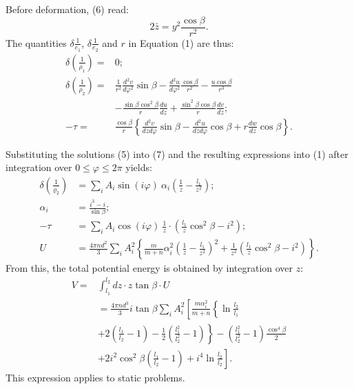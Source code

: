 \documentclass[11pt]{amsart}
\begin{document}
Before deformation, (6) read:
\[2\bar{z}=y^2 \frac{\cos \beta}{r^2}.\]
The quantities
\(\delta \frac{1}{e_1}\), \(\delta \frac{1}{e_2} \)
and \(r\) in Equation (1) are thus:
\begin{equation}\label{eq7p733}
\begin{aligned}
\delta\left(\frac{1}{\rho_1}\right)= & 0; \\
\delta\left(\frac{1}{\rho_2}\right)= & \frac{1}{r^2} \frac{d^2 v}{d \varphi^2} \sin \beta-\frac{d^2 u}{d \varphi^2} \frac{\cos \beta}{r^2}-\frac{u \cos \beta}{r^3} \\
& -\frac{\sin \beta \cos ^2 \beta}{r} \frac{d u}{d z}+\frac{\sin ^2 \beta \cos \beta}{r} \frac{d v}{d z}; \\
-\tau= & \frac{\cos \beta}{r}\left\{\frac{d^2 v}{d z d \varphi} \sin \beta-\frac{d^2 u}{d z d \varphi} \cos \beta
+r \frac{d w}{d z} \cos \beta\right\} .
\end{aligned}
\end{equation}


Substituting the solutions (5) into (7) and the resulting expressions into (1)
after integration over \( 0 \leq \varphi \leq 2 \pi \) yields:
\begin{equation}\label{eq8p733}
\begin{aligned}
\delta\left(\frac{1}{\varrho_2}\right) & =\sum_i A_i \sin(i \varphi) ~ \alpha_i\left(\frac{1}{z}-\frac{l_1}{z^2}\right); \\
\alpha_i & =\frac{i^3-i}{\sin \beta}; \\
-\tau & =\sum_i A_i \cos( i \varphi) ~ \frac{1}{z} \cdot\left(\frac{l_1}{z} \cos ^2 \beta-i^2\right); \\
U & =\frac{4 \pi n d^2}{3} \sum_i A_i^2\left\{\frac{m}{m+n} \alpha_i^2\left(\frac{1}{z}-\frac{l_1}{z^2}\right)^2
 +\frac{1}{z^2}\left(\frac{l_1}{z} \cos ^2 \beta-i^2\right)\right\} .
\end{aligned}
\end{equation}
From this, the total potential energy is obtained by integration over \(z\):
\begin{equation}\label{eq9p733}
\begin{aligned}
V= & \int_{l_1}^{l_2} d z \cdot z \tan \beta \cdot U \\
& =\frac{4 \pi n d^3}{3}i \tan \beta \sum_i A_i^2\left[\frac { m \alpha _ { i } ^ { 2 } } { m + n } \left\{\ln \frac{l_2}{l_1}\right.\right. \\
& \left.+2\left(\frac{l_1}{l_2}-1\right)-\frac{1}{2}\left(\frac{l_1^2}{l_2^2}-1\right)\right\}-\left(\frac{l_1^2}{l_2^2}-1\right) \frac{\cos ^4 \beta}{2} \\
& \left.+2 i^2 \cos ^2 \beta\left(\frac{l_1}{l_2}-1\right)+i^4 \ln \frac{l_2}{l_2}\right] .
\end{aligned}
\end{equation}
This expression applies to static problems.
\end{document}
